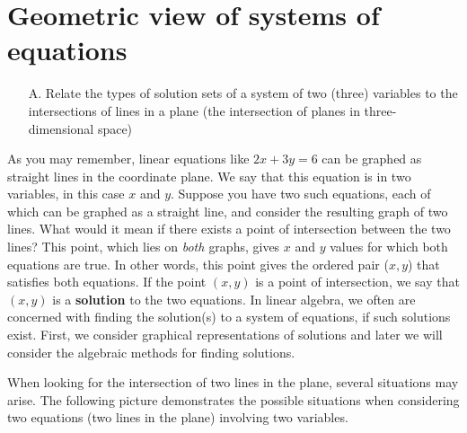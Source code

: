 \section{Geometric view of systems of equations}
\label{sec:systems-geometric}

\begin{outcome}
\begin{enumerate}
\item[A.] Relate the types of solution sets of a system of two (three)
variables to the intersections of lines in a plane (the intersection of
planes in three-dimensional space)
\end{enumerate}
\end{outcome}

As you may remember, linear equations like $2x+3y=6$ can be graphed as
straight lines in the coordinate plane. We say that this equation is
in two variables, in this case $x$ and $y$.  Suppose you have two such
equations, each of which can be graphed as a straight line, and consider
the resulting graph of two lines. What would it mean if there exists a
point of intersection between the two lines? This point, which lies on
{\em both \em} graphs, gives $x$ and $y$ values for which both
equations are true. In other words, this point gives the ordered pair
($x,y$) that satisfies both equations.  If the point $\left( x, y
\right)$ is a point of intersection, we say that $\left( x, y \right)$
is a \textbf{solution} to the two equations. In linear algebra, we
often are concerned with finding the solution(s) to a system of
equations, if such solutions exist.  First, we consider graphical
representations of solutions and later we will consider the algebraic
methods for finding solutions.

When looking for the intersection of two lines in the plane, several situations may arise. The following picture demonstrates the possible situations
when considering two equations (two lines in the plane) involving two variables.



